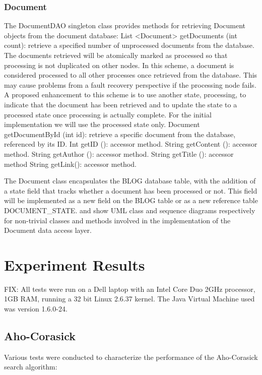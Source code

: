 \documentclass[10pt]{report}
\begin{document}
\subsubsection{Document}
\label{sec:document}
The DocumentDAO singleton class provides methods for retrieving
Document objects from the document database: List <Document>
getDocuments (int count): retrieve a specified number of unprocessed
documents from the database. The documents retrieved will be
atomically marked as processed so that processing is not duplicated on
other nodes. In this scheme, a document is considered processed to all
other processes once retrieved from the database. This may cause
problems from a fault recovery perspective if the processing node
fails. A proposed enhancement to this scheme is to use another state,
processing, to indicate that the document has been retrieved and to
update the state to a processed state once processing is actually
complete. For the initial implementation we will use the processed
state only.
Document getDocumentById (int id): retrieve a specific document from the database, referenced by its ID.
Int getID (): accessor method.
String getContent (): accessor method.
String getAuthor (): accessor method.
String getTitle (): accessor method
String getLink(): accessor method.

The Document class encapsulates the BLOG database table, with the
addition of a state field that tracks whether a document has been
processed or not. This field will be implemented as a new field on the
BLOG table or as a new reference table DOCUMENT_STATE.  and show UML
class and sequence diagrams respectively for non-trivial classes and
methods involved in the implementation of the Document data access
layer.


\section{Experiment Results}
\label{sec:experimentresults}
FIX: All tests were run on a Dell laptop with an Intel Core Duo 2GHz
processor, 1GB RAM, running a 32 bit Linux 2.6.37 kernel. The Java
Virtual Machine used was version 1.6.0-24. 


\subsection{Aho-Corasick}
Various tests were conducted to characterize the performance of the
Aho-Corasick search algorithm:
\end{document}
